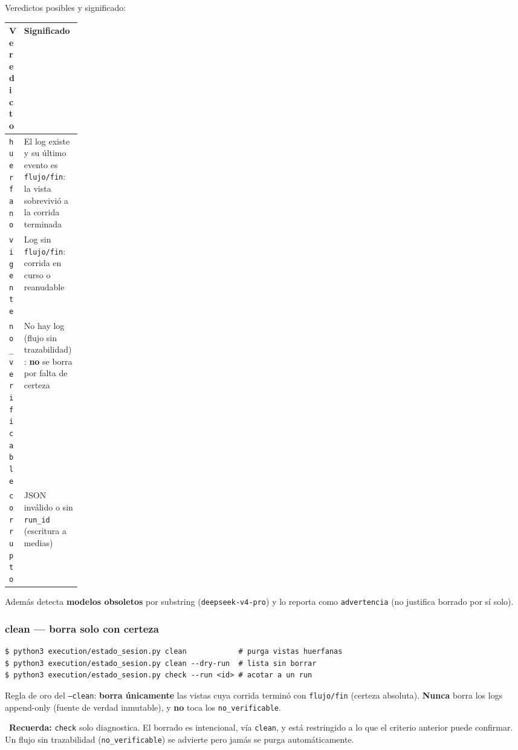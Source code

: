 \documentclass[11pt,a4paper]{article}
\begin{document}
Veredictos posibles y significado:

\begin{center}
\begin{tabularx}{\linewidth}{>{\raggedright\arraybackslash}p{0.14\linewidth} X}
\toprule
\textbf{Veredicto} & \textbf{Significado} \\
\midrule
\texttt{huerfano} & El log existe y su último evento es \texttt{flujo/fin}: la vista sobrevivió a la corrida terminada \\
\texttt{vigente} & Log sin \texttt{flujo/fin}: corrida en curso o reanudable \\
\texttt{no\_verificable} & No hay log (flujo sin trazabilidad): \textbf{no} se borra por falta de certeza \\
\texttt{corrupto} & JSON inválido o sin \texttt{run\_id} (escritura a medias) \\
\bottomrule
\end{tabularx}
\end{center}

Además detecta \textbf{modelos obsoletos} por substring (\texttt{deepseek-v4-pro}) y lo
reporta como \texttt{advertencia} (no justifica borrado por sí solo).

\subsubsection{clean --- borra solo con certeza}
\begin{lstlisting}[style=estiloPython]
$ python3 execution/estado_sesion.py clean            # purga vistas huerfanas
$ python3 execution/estado_sesion.py clean --dry-run  # lista sin borrar
$ python3 execution/estado_sesion.py check --run <id> # acotar a un run
\end{lstlisting}

Regla de oro del \texttt{--clean}: \textbf{borra únicamente} las vistas cuya corrida
terminó con \texttt{flujo/fin} (certeza absoluta). \textbf{Nunca} borra los logs
append-only (fuente de verdad inmutable), y \textbf{no} toca los
\texttt{no\_verificable}.

\begin{cajaRecuerda}
~\textbf{Recuerda:} \texttt{check} solo diagnostica. El borrado es
intencional, vía \texttt{clean}, y está restringido a lo que el criterio anterior puede
confirmar. Un flujo sin trazabilidad (\texttt{no\_verificable}) se advierte pero jamás
se purga automáticamente.
\end{cajaRecuerda}
\end{document}
